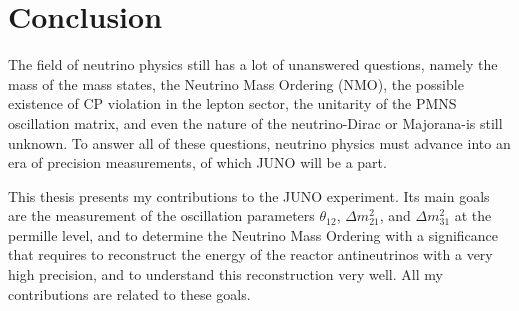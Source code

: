 \documentclass[../main.tex]{subfiles}
\begin{document}
\chapter*{Conclusion}

The field of neutrino physics still has a lot of unanswered questions, namely the mass of the mass states, the Neutrino Mass Ordering (NMO), the possible existence of CP violation in the lepton sector, the unitarity of the PMNS oscillation matrix, and even the nature of the neutrino-Dirac or Majorana-is still unknown. To answer all of these questions, neutrino physics must advance into an era of precision measurements, of which JUNO will be a part.
%
%
%

This thesis presents my contributions to the JUNO experiment. Its main goals are the measurement of the oscillation parameters $\theta_{12}$, $\Delta m^2_{21}$, and $\Delta m^2_{31}$ at the permille level, and to determine the Neutrino Mass Ordering with a significance that requires to reconstruct the energy of the reactor antineutrinos with a very high precision, and to understand this reconstruction very well. All my contributions are related to these goals.
\end{document}
